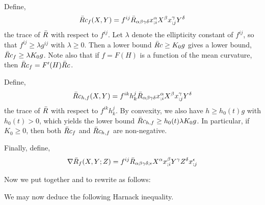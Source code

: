 Define,
\[
\-Rc_{f} (X, Y) = f^{ij} \-R_{\alpha\beta\gamma\delta} x_{;i}^{\alpha} X^{\beta} x_{;j}^{\gamma} Y^{\delta}
\]
the trace of $\-R$ with respect to $f^{ij}$. Let $\lambda$ denote the ellipticity constant of $f^{ij}$, so that $f^{ij} \geq \lambda g^{ij}$ with $\lambda \geq 0$. Then a lower bound $\-Rc \geq K_0 g$ gives a lower bound, $\-Rc_{f} \geq \lambda K_0 g$. Note also that if $f = F(H)$ is a function of the mean curvature, then $\-Rc_f = F'(H) \-Rc$.

Define,
\[
\-Rc_{h,f} (X, Y) = f^{ik}h_k^j \-R_{\alpha\beta\gamma\delta} x_{;i}^{\a} X^{\b} x_{;j}^{\g} Y^{\d}
\]
the trace of $\-R$ with respect to $f^{ik}h_k^j$.  By convexity, we also have $h \geq h_0(t) g$ with $h_0(t) > 0$, which yields the lower bound $\-Rc_{h,f} \geq h_0(t) \lambda K_0 g$. In particular, if $K_0 \geq 0$, then both $\-Rc_f$ and $\-Rc_{h,f}$ are non-negative.

Finally, define,
\[
\nabla \-R_f (X, Y; Z) = f^{ij} \-R_{\a\b\g\d;\e}X^{\a}x^{\b}_{;i}Y^{\g}Z^{\d}x^{\e}_{;j}
\]

Now we put together  and  to rewrite  as follows:



We may now deduce the following Harnack inequality.


